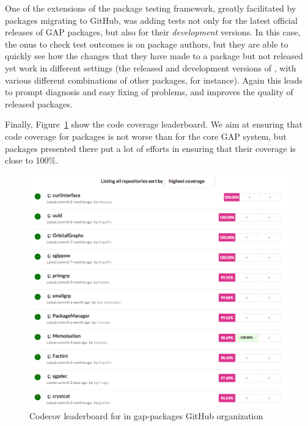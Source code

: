 One of the extensions of the package testing framework, greatly 
facilitated by packages migrating to GitHub, was adding tests not
only for the latest official releases of GAP packages, but also
for their \emph{development} versions.
In this case, the onus to check test outcomes is on package authors,
but they are able to quickly see how the changes that they have made to
a package but not released yet work in different settings (the
released and development versions of \GAP, with various different
combinations of other packages, for instance). Again this leads to
prompt diagnosis and easy fixing of problems, and improves the quality
of released packages.



Finally, Figure~\ref{fig:gap-packages-codecov} show the code coverage
leaderboard. We aim at ensuring that code coverage for packages is 
not worse than for the core GAP system, but packages presented there 
put a lot of efforts in ensuring that their coverage is close to 100\%. 

\begin{figure}[!ht]
    \centering
    \includegraphics[width=\textwidth]{images/gap-packages-codecov}
    \caption{Codecov leaderboard for in gap-packages GitHub organization}
    \label{fig:gap-packages-codecov}
\end{figure}

